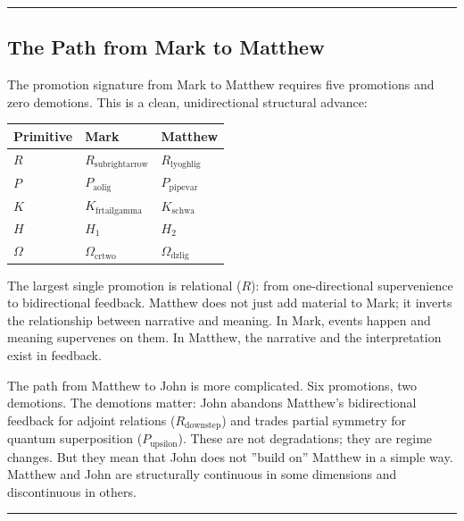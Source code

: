 \documentclass[12pt,a4paper]{article}
\begin{document}
\begin{center}
\rule{0.5\textwidth}{0.4pt}
\end{center}

\subsection{The Path from Mark to Matthew}

The promotion signature from Mark to Matthew requires five promotions and zero demotions. This is a clean, unidirectional structural advance:

\begin{table}[htbp]
\centering
\small
{}
\begin{tabularx}{\textwidth}{>{\centering\arraybackslash}X >{\centering\arraybackslash}X >{\centering\arraybackslash}X}
\toprule
\rowcolor{gray!25}\textbf{Primitive} & \textbf{Mark} & \textbf{Matthew} \\
\midrule
\rowcolors{1}{white}{gray!10}
$R$ & $R_{\text{subrightarrow}}$ & $R_{\text{lyoghlig}}$ \\
$P$ & $P_{\text{aolig}}$ & $P_{\text{pipevar}}$ \\
$K$ & $K_{\text{frtailgamma}}$ & $K_{\text{schwa}}$ \\
$H$ & $H_1$ & $H_2$ \\
$\Omega$ & $\Omega_{\text{crtwo}}$ & $\Omega_{\text{dzlig}}$ \\
\bottomrule
\end{tabularx}
\end{table}

The largest single promotion is relational ($R$): from one-directional supervenience to bidirectional feedback. Matthew does not just add material to Mark; it inverts the relationship between narrative and meaning. In Mark, events happen and meaning supervenes on them. In Matthew, the narrative and the interpretation exist in feedback.

The path from Matthew to John is more complicated. Six promotions, two demotions. The demotions matter: John abandons Matthew's bidirectional feedback for adjoint relations ($R_{\text{downstep}}$) and trades partial symmetry for quantum superposition ($P_{\text{upsilon}}$). These are not degradations; they are regime changes. But they mean that John does not ''build on'' Matthew in a simple way. Matthew and John are structurally continuous in some dimensions and discontinuous in others.

\begin{center}
\rule{0.5\textwidth}{0.4pt}
\end{center}
\end{document}
